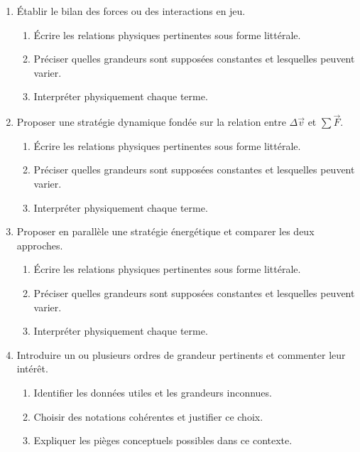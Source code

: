 \documentclass[11pt,a4paper]{article}
\begin{document}
\begin{enumerate}[label=\textbf{Très long \arabic*.},leftmargin=*]
\begin{enumerate}[label=\textbf{\arabic*)}]
\begin{enumerate}[label=\alph*)]
\item Identifier les données utiles et les grandeurs inconnues.
\item Choisir des notations cohérentes et justifier ce choix.
\item Expliquer les pièges conceptuels possibles dans ce contexte.
\end{enumerate}
\item Établir le bilan des forces ou des interactions en jeu.
\begin{enumerate}[label=\alph*)]
\item Écrire les relations physiques pertinentes sous forme littérale.
\item Préciser quelles grandeurs sont supposées constantes et lesquelles peuvent varier.
\item Interpréter physiquement chaque terme.
\end{enumerate}
\item Proposer une stratégie dynamique fondée sur la relation entre $\Delta\vec v$ et $\sum\vec F$.
\begin{enumerate}[label=\alph*)]
\item Écrire les relations physiques pertinentes sous forme littérale.
\item Préciser quelles grandeurs sont supposées constantes et lesquelles peuvent varier.
\item Interpréter physiquement chaque terme.
\end{enumerate}
\item Proposer en parallèle une stratégie énergétique et comparer les deux approches.
\begin{enumerate}[label=\alph*)]
\item Écrire les relations physiques pertinentes sous forme littérale.
\item Préciser quelles grandeurs sont supposées constantes et lesquelles peuvent varier.
\item Interpréter physiquement chaque terme.
\end{enumerate}
\item Introduire un ou plusieurs ordres de grandeur pertinents et commenter leur intérêt.
\begin{enumerate}[label=\alph*)]
\item Identifier les données utiles et les grandeurs inconnues.
\item Choisir des notations cohérentes et justifier ce choix.
\item Expliquer les pièges conceptuels possibles dans ce contexte.

\end{enumerate}
\end{enumerate}
\end{enumerate}
\end{document}
